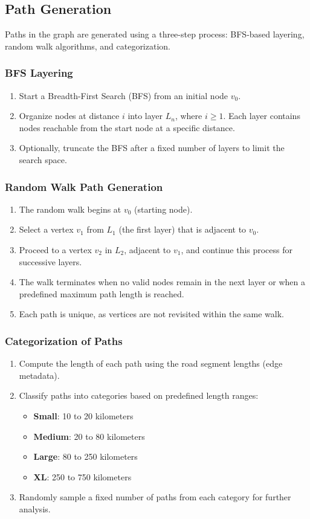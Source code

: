\documentclass[sigplan,screen]{acmart}
\begin{document}
\subsection{Path Generation}
Paths in the graph are generated using a three-step process: BFS-based layering, random walk algorithms, and categorization.

\subsubsection{BFS Layering}
\begin{enumerate}
    \item Start a Breadth-First Search (BFS) from an initial node $v_0$.
    \item Organize nodes at distance $i$ into layer $L_n$, where $i \geq 1$. Each layer contains nodes reachable from the start node at a specific distance.
    \item Optionally, truncate the BFS after a fixed number of layers to limit the search space.
\end{enumerate}

\subsubsection{Random Walk Path Generation}
\begin{enumerate}
    \item The random walk begins at $v_0$ (starting node).
    \item Select a vertex $v_1$ from $L_1$ (the first layer) that is adjacent to $v_0$.
    \item Proceed to a vertex $v_2$ in $L_2$, adjacent to $v_1$, and continue this process for successive layers.
    \item The walk terminates when no valid nodes remain in the next layer or when a predefined maximum path length is reached.
    \item Each path is unique, as vertices are not revisited within the same walk.
\end{enumerate}

\subsubsection{Categorization of Paths}
\begin{enumerate}
    \item Compute the length of each path using the road segment lengths (edge metadata).
    \item Classify paths into categories based on predefined length ranges:
    \begin{itemize}
        \item \textbf{Small}: 10 to 20 kilometers
        \item \textbf{Medium}: 20 to 80 kilometers
        \item \textbf{Large}: 80 to 250 kilometers
        \item \textbf{XL}: 250 to 750 kilometers
    \end{itemize}
    \item Randomly sample a fixed number of paths from each category for further analysis.
\end{enumerate}
\end{document}
